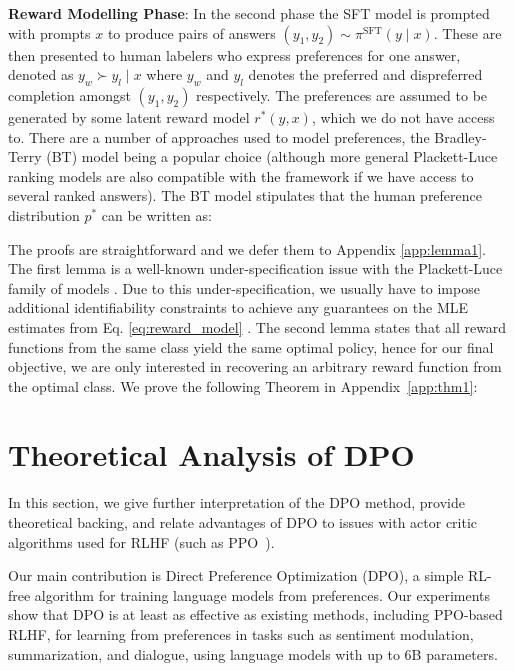 \textbf{Reward Modelling Phase}: In the second phase the SFT model is prompted with prompts $x$ to produce pairs of answers $(y_1, y_2)\sim \pi^\text{SFT}(y \mid x)$. These are then presented to human labelers who express preferences for one answer, denoted as $y_w\succ y_l \mid x$ where $y_w$ and $y_l$ denotes the preferred and dispreferred completion amongst $(y_1, y_2)$ respectively. The preferences are assumed to be generated by some latent reward model $r^*(y, x)$, which we do not have access to. There are a number of approaches used to model preferences, the Bradley-Terry (BT) \cite{bradley1952rankanalysis} model being a popular choice (although more general Plackett-Luce ranking models \citep{plackett1975analysis, luce2012individual} are also compatible with the framework if we have access to several ranked answers). The BT model stipulates that the human preference distribution $p^*$ can be written as:

The proofs are straightforward and we defer them to Appendix \ref{app:lemma1}. The first lemma is a well-known under-specification issue with the Plackett-Luce family of models \cite{plackett1975analysis}. Due to this under-specification, we usually have to impose additional identifiability constraints to achieve any guarantees on the MLE estimates from Eq. \ref{eq:reward_model} \cite{bong2022generalized}. The second lemma states that all reward functions from the same class yield the same optimal policy, hence for our final objective, we are only interested in recovering an arbitrary reward function from the optimal class. We prove the following Theorem in Appendix~\ref{app:thm1}:

\section{Theoretical Analysis of DPO} In this section, we give further interpretation of the DPO method, provide theoretical backing, and relate advantages of DPO to issues with actor critic algorithms used for RLHF (such as PPO~\cite{schulman2017proximal}).

Our main contribution is Direct Preference Optimization (DPO), a simple RL-free algorithm for training language models from preferences. Our experiments show that DPO is at least as effective as existing methods, including PPO-based RLHF, for learning from preferences in tasks such as sentiment modulation, summarization, and dialogue, using language models with up to 6B parameters.

